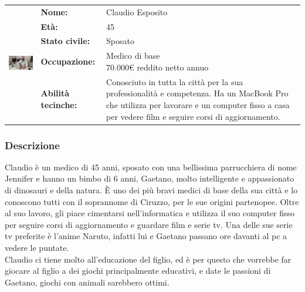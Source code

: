 \documentclass[../Report.tex]{subfiles}
\begin{document}
    \vspace{1.5cm}

    \begin{table}[H]
        \begin{tabular}{|c|l|p{7cm}|}
            \hline
            \multirow{5}{*}{\includegraphics[width=5cm, height=5cm]{Claudio.jpg}} 
                & \textbf{Nome:} & Claudio Esposito\\ \cmidrule{2-3}
            & \textbf{Età:} & 45 \\ \cmidrule{2-3}
            & \textbf{Stato civile:} & Sposato \\ \cmidrule{2-3}
            & \textbf{Occupazione:} & \makecell{Medico di base \\ 70.000€ reddito netto annuo} \\ \cmidrule{2-3}
            & \textbf{Abilità tecinche:} &  Conosciuto in tutta la città per la sua professionalità e competenza. Ha un MacBook Pro che utilizza per lavorare e un computer fisso a casa per vedere film e seguire corsi di aggiornamento.\\
            \hline
        \end{tabular}
    \end{table}

    \subsubsection{Descrizione}
    Claudio è un medico di 45 anni, sposato con una bellissima parrucchiera di nome Jennifer e hanno un bimbo di 6 anni, Gaetano, molto intelligente e appassionato di dinosauri e della natura. È uno dei più bravi medici di base della sua città e lo conoscono tutti con il soprannome di Ciruzzo, per le sue origini partenopee. Oltre al suo lavoro, gli piace cimentarsi nell'informatica e utilizza il suo computer fisso per seguire corsi di aggiornamento e guardare film e serie tv. Una delle sue serie tv preferite è l'anime Naruto, infatti lui e Gaetano passano ore davanti al pc a vedere le puntate.\\
    Claudio ci tiene molto all'educazione del figlio, ed è per questo che vorrebbe far giocare al figlio a dei giochi principalmente educativi, e date le passioni di Gaetano, giochi con animali sarebbero ottimi.
\end{document}
